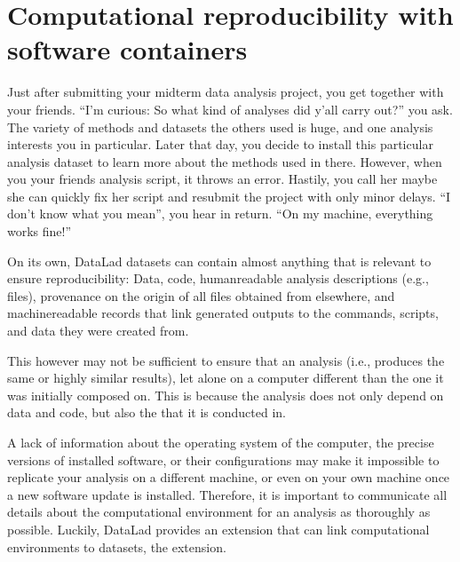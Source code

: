 \section{Computational reproducibility with software containers}
\label{\detokenize{basics/101-133-containersrun:computational-reproducibility-with-software-containers}}\label{\detokenize{basics/101-133-containersrun:containersrun}}\label{\detokenize{basics/101-133-containersrun:index-0}}\label{\detokenize{basics/101-133-containersrun::doc}}
\sphinxAtStartPar
Just after submitting your midterm data analysis project, you get together
with your friends. “I’m curious: So what kind of analyses did y’all carry out?”
you ask. The variety of methods and datasets the others used is huge, and
one analysis interests you in particular. Later that day, you decide to
install this particular analysis dataset to learn more about the methods used
in there. However, when you  your friends analysis script,
it throws an error. Hastily, you call her \textendash{} maybe she can quickly fix her
script and resubmit the project with only minor delays. “I don’t know what
you mean”, you hear in return.
“On my machine, everything works fine!”

\sphinxAtStartPar
On its own, DataLad datasets can contain almost anything that is relevant to
ensure reproducibility: Data, code, human\sphinxhyphen{}readable analysis descriptions
(e.g.,  files), provenance on the origin of all files
obtained from elsewhere, and machine\sphinxhyphen{}readable records that link generated
outputs to the commands, scripts, and data they were created from.

\sphinxAtStartPar
This however may not be sufficient to ensure that an analysis 
(i.e., produces the same or highly similar results), let alone  on a
computer different than the one it was initially composed on. This is because
the analysis does not only depend on data and code, but also the
 that it is conducted in.

\sphinxAtStartPar
A lack of information about the operating system of the computer, the precise
versions of installed software, or their configurations may
make it impossible to replicate your analysis on a different machine, or even
on your own machine once a new software update is installed. Therefore, it is
important to communicate all details about the computational environment for
an analysis as thoroughly as possible. Luckily, DataLad provides an extension
that can link computational environments to datasets, the
extension.

